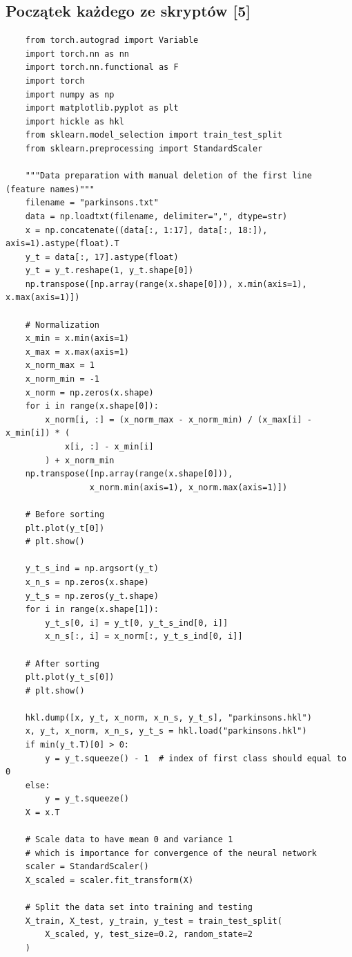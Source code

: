 \documentclass{article}
\begin{document}
\subsection{Początek każdego ze skryptów [5]}
\begin{verbatim}
    from torch.autograd import Variable
    import torch.nn as nn
    import torch.nn.functional as F
    import torch
    import numpy as np
    import matplotlib.pyplot as plt
    import hickle as hkl
    from sklearn.model_selection import train_test_split
    from sklearn.preprocessing import StandardScaler
    
    """Data preparation with manual deletion of the first line (feature names)"""
    filename = "parkinsons.txt"
    data = np.loadtxt(filename, delimiter=",", dtype=str)
    x = np.concatenate((data[:, 1:17], data[:, 18:]), axis=1).astype(float).T
    y_t = data[:, 17].astype(float)
    y_t = y_t.reshape(1, y_t.shape[0])
    np.transpose([np.array(range(x.shape[0])), x.min(axis=1), x.max(axis=1)])
    
    # Normalization
    x_min = x.min(axis=1)
    x_max = x.max(axis=1)
    x_norm_max = 1
    x_norm_min = -1
    x_norm = np.zeros(x.shape)
    for i in range(x.shape[0]):
        x_norm[i, :] = (x_norm_max - x_norm_min) / (x_max[i] - x_min[i]) * (
            x[i, :] - x_min[i]
        ) + x_norm_min
    np.transpose([np.array(range(x.shape[0])),
                 x_norm.min(axis=1), x_norm.max(axis=1)])
    
    # Before sorting
    plt.plot(y_t[0])
    # plt.show()
    
    y_t_s_ind = np.argsort(y_t)
    x_n_s = np.zeros(x.shape)
    y_t_s = np.zeros(y_t.shape)
    for i in range(x.shape[1]):
        y_t_s[0, i] = y_t[0, y_t_s_ind[0, i]]
        x_n_s[:, i] = x_norm[:, y_t_s_ind[0, i]]
    
    # After sorting
    plt.plot(y_t_s[0])
    # plt.show()
    
    hkl.dump([x, y_t, x_norm, x_n_s, y_t_s], "parkinsons.hkl")
    x, y_t, x_norm, x_n_s, y_t_s = hkl.load("parkinsons.hkl")
    if min(y_t.T)[0] > 0:
        y = y_t.squeeze() - 1  # index of first class should equal to 0
    else:
        y = y_t.squeeze()
    X = x.T
    
    # Scale data to have mean 0 and variance 1
    # which is importance for convergence of the neural network
    scaler = StandardScaler()
    X_scaled = scaler.fit_transform(X)
    
    # Split the data set into training and testing
    X_train, X_test, y_train, y_test = train_test_split(
        X_scaled, y, test_size=0.2, random_state=2
    )
\end{verbatim}
\end{document}
